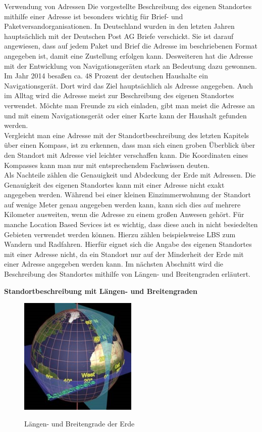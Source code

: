 Verwendung von Adressen
Die vorgestellte Beschreibung des eigenen Standortes mithilfe einer Adresse ist besonders wichtig für Brief- und Paketversandorganisationen. In Deutschland wurden in den letzten Jahren hauptsächlich mit der Deutschen Post AG Briefe verschickt. Sie ist darauf angewiesen, dass auf jedem Paket und Brief die Adresse im beschriebenen Format angegeben ist, damit eine Zustellung erfolgen kann.
Desweiteren hat die Adresse mit der Entwicklung von Navigationsgeräten stark an Bedeutung dazu gewonnen. Im Jahr 2014 besaßen ca. 48 Prozent der deutschen Haushalte ein Navigationsgerät. Dort wird das Ziel hauptsächlich als Adresse angegeben. 
Auch im Alltag wird die Adresse meist zur Beschreibung des eigenen Standortes verwendet. Möchte man Freunde zu sich einladen, gibt man meist die Adresse an und mit einem Navigationsgerät oder einer Karte kann der Haushalt gefunden werden.
\\Vergleicht man eine Adresse mit der Standortbeschreibung des letzten Kapitels über einen Kompass, ist zu erkennen, dass man sich einen groben Überblick über den Standort mit Adresse viel leichter verschaffen kann. Die Koordinaten eines Kompasses kann man nur mit entsprechendem Fachwissen deuten. 
\\Als Nachteile zählen die Genauigkeit und Abdeckung der Erde mit Adressen. Die Genauigkeit des eigenen Standortes kann mit einer Adresse nicht exakt angegeben werden. Während bei einer kleinen Einzimmerwohnung der Standort auf wenige Meter genau angegeben werden kann, kann sich dies auf mehrere Kilometer ausweiten, wenn die Adresse zu einem großen Anwesen gehört. Für manche Location Based Sevices ist es wichtig, dass diese auch in nicht besiedelten Gebieten verwendet werden können. Hierzu zählen beispielsweise LBS zum Wandern und Radfahren. Hierfür eignet sich die Angabe des eigenen Standortes mit einer Adresse nicht, da ein Standort nur auf der Minderheit der Erde mit einer Adresse angegeben werden kann. 
Im nächsten Abschnitt wird die Beschreibung des Standortes mithilfe von Längen- und Breitengraden erläutert.

\textbf{Standortbeschreibung mit Längen- und Breitengraden}


\begin{figure}
  \centering
    \includegraphics[width=0.50\textwidth]{ref/images/grade.jpg}
   \caption{Längen- und Breitengrade der Erde}
  \label{fig:Grade der Erde}
   \cite{Grade}
\end{figure}



